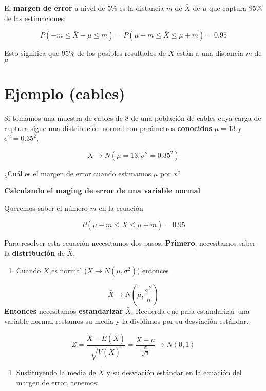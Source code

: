 \documentclass[
]{book}
\providecommand{\tightlist}{%
  \setlength{\itemsep}{0pt}\setlength{\parskip}{0pt}}
\begin{document}
El \textbf{margen de error} a nivel de \(5\%\) es la distancia \(m\) de \(\bar{X}\) de \(\mu\) que captura \(95\%\) de las estimaciones:

\[P(-m \leq \bar{X}-\mu \leq m)=P(\mu-m \leq \bar{X} \leq\mu + m)=0.95\]

Esto significa que \(95\%\) de los posibles resultados de \(\bar{X}\) están a una distancia \(m\) de \(\mu\)

\hypertarget{ejemplo-cables}{%
\section{Ejemplo (cables)}\label{ejemplo-cables}}

Si tomamos una muestra de cables de \(8\) de una población de cables cuya carga de ruptura sigue una distribución normal con parámetros \textbf{conocidos} \(\mu=13\) y \(\sigma^2=0.35^2\),

\[X \rightarrow N(\mu=13, \sigma^2=0.35^2)\]

¿Cuál es el margen de error cuando estimamos \(\mu\) por \(\bar{x}\)?

\textbf{Calculando el maging de error de una variable normal}

Queremos saber el número \(m\) en la ecuación

\[P(\mu-m \leq \bar{X} \leq\mu + m)=0.95\]

Para resolver esta ecuación necesitamos dos pasos. \textbf{Primero}, necesitamos saber la \textbf{distribución} de \(\bar{X}\).

\begin{enumerate}
\def\labelenumi{\arabic{enumi}.}
\tightlist
\item
  Cuando \(X\) es normal (\(X \rightarrow N(\mu, \sigma^2)\)) entonces
\end{enumerate}

\[\bar{X} \rightarrow N(\mu, \frac{\sigma^2}{n})\]
\textbf{Entonces} necesitamos \textbf{estandarizar} \(\bar{X}\). Recuerda que para estandarizar una variable normal restamos su media y la dividimos por su desviación estándar.

\[Z=\frac{\bar{X}-E(\bar{X})}{\sqrt{V(\bar{X})}} =\frac{\bar{X}-\mu}{ \frac{\sigma}{\sqrt{n}}} \rightarrow N(0,1)\]

\begin{enumerate}
\def\labelenumi{\arabic{enumi}.}
\setcounter{enumi}{1}
\tightlist
\item
  Sustituyendo la media de \(\bar{X}\) y su desviación estándar en la ecuación del margen de error, tenemos:
\end{enumerate}
\end{document}
